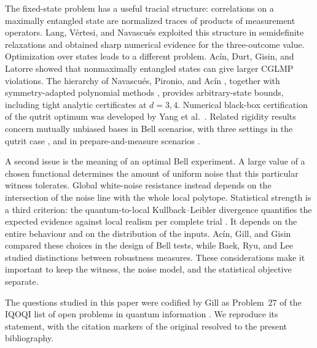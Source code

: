 \documentclass[11pt]{amsart}
\theoremstyle{remark}
\theoremstyle{plain}
\numberwithin{equation}{section}
\begin{document}
The fixed-state problem has a useful tracial structure: correlations
on a maximally entangled state are normalized traces of products of
measurement operators. Lang, V\'ertesi, and Navascu\'es \cite{LVN}
exploited this structure in semidefinite relaxations and obtained
sharp numerical evidence for the three-outcome value. Optimization
over states leads to a different problem. Ac\'in, Durt, Gisin, and
Latorre \cite{ADGL} showed that nonmaximally entangled states can give
larger CGLMP violations. The hierarchy of Navascu\'es, Pironio, and
Ac\'in \cite{NPA}, together with symmetry-adapted polynomial methods
\cite{IR}, provides arbitrary-state bounds, including tight analytic
certificates at \(d=3,4\). Numerical black-box certification of the
qutrit optimum was developed by Yang et al.\ \cite{Yang}. Related
rigidity results concern mutually unbiased bases in Bell scenarios,
with three settings in the qutrit case \cite{Kaniewski}, and in
prepare-and-measure scenarios \cite{Farkas}.

A second issue is the meaning of an optimal Bell experiment. A large
value of a chosen functional determines the amount of uniform noise
that this particular witness tolerates. Global white-noise resistance
instead depends on the intersection of the noise line with the whole
local polytope. Statistical strength is a third criterion: the
quantum-to-local Kullback--Leibler divergence quantifies the expected
evidence against local realism per complete trial \cite{VDGG,AGG}.
It depends on the entire behaviour and on the distribution of the
inputs. Ac\'in, Gill, and Gisin \cite{AGG} compared these choices in
the design of Bell tests, while Baek, Ryu, and Lee \cite{BRL}
studied distinctions between robustness measures. These considerations
make it important to keep the witness, the noise model, and the
statistical objective separate.

The questions studied in this paper were codified by Gill as Problem~27
of the IQOQI list of open problems in quantum information \cite{OQP}.
We reproduce its statement, with the citation markers of the original
resolved to the present bibliography.
\end{document}
